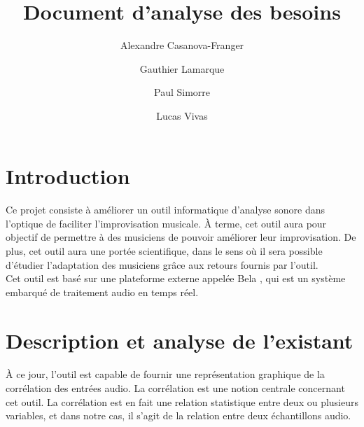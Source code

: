 \documentclass{article}
\title{Document d'analyse des besoins}
\author{Alexandre Casanova-Franger\\
        \and
        Gauthier Lamarque\\
        \and
        Paul Simorre\\
        \and
        Lucas Vivas\\}
\begin{document}
\maketitle
\section{Introduction}
\paragraph{}
Ce projet consiste à améliorer un outil informatique d'analyse sonore dans
l'optique de faciliter l'improvisation musicale. À terme, cet outil aura pour
objectif de permettre à des musiciens de pouvoir améliorer leur
improvisation. De plus, cet outil aura une portée scientifique, dans le sens
où il sera possible d'étudier l'adaptation des musiciens grâce aux retours
fournis par l'outil. \\
Cet outil est basé sur une plateforme externe appelée Bela \cite{BELA},
qui est un système embarqué de traitement audio en temps réel.
\section{Description et analyse de l'existant}
\paragraph{}
À ce jour, l'outil est capable de fournir une représentation graphique de la
corrélation des entrées audio. La corrélation est une notion centrale
concernant cet outil. La corrélation est en fait une relation statistique
entre deux ou plusieurs variables, et dans notre cas, il s'agit de la
relation entre deux échantillons audio.
\end{document}
